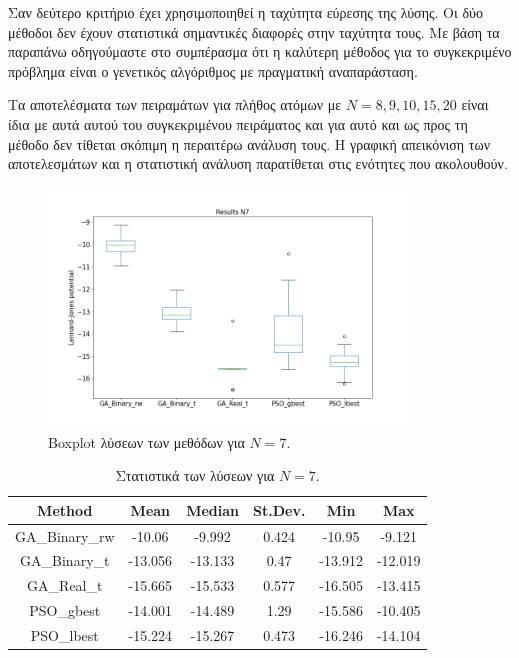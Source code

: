 \documentclass[12pt, a4paper]{article}
\newcommand{\en}{\selectlanguage{english}}
\newcommand{\gr}{\selectlanguage{greek}}
\begin{document}
Σαν δεύτερο κριτήριο έχει χρησιμοποιηθεί η ταχύτητα εύρεσης της λύσης. Οι δύο μέθοδοι δεν έχουν στατιστικά σημαντικές διαφορές στην ταχύτητα τους. Με βάση τα παραπάνω οδηγούμαστε στο συμπέρασμα ότι η καλύτερη μέθοδος για το συγκεκριμένο πρόβλημα είναι ο γενετικός αλγόριθμος με πραγματική αναπαράσταση.

Τα αποτελέσματα των πειραμάτων για πλήθος ατόμων με $Ν = 8, 9, 10, 15, 20$ είναι ίδια με αυτά αυτού του συγκεκριμένου πειράματος και για αυτό και  ως προς τη μέθοδο δεν τίθεται σκόπιμη η περαιτέρω ανάλυση τους. Η γραφική απεικόνιση των αποτελεσμάτων και η στατιστική ανάλυση παρατίθεται στις ενότητες που ακολουθούν.

\begin{figure}[H]
	\centering
	\includegraphics[width=0.85\textwidth, height=0.4\textheight]{../Results/N7/Boxplot_solutions_quality.png}
	
	\caption{\en Boxplot \gr λύσεων των μεθόδων για $N = 7$.}
	\label{box:sol_qual_N7}
\end{figure}


\begin{table}[H]
	\centering
	\begin{tabular}{| c | c | c | c | c | c |}
		
		\hline
		\en Method & \en Mean & \en Median & \en St.Dev. & \en Min & \en Max \\
		
		\hline
		\en GA\_Binary\_rw & -10.06 & -9.992 & 0.424 & -10.95 & -9.121 \\ 
		
		\hline
		\en GA\_Binary\_t & -13.056 & -13.133 & 0.47 & -13.912 & -12.019 \\ 
		
		\hline
		\en GA\_Real\_t & -15.665 & -15.533 & 0.577 & -16.505 & -13.415 \\ 
		
		\hline
		\en PSO\_gbest & -14.001 & -14.489 & 1.29 & -15.586 & -10.405\\ 
		
		\hline
		\en PSO\_lbest & -15.224 & -15.267 & 0.473 & -16.246 & -14.104\\ 
		
		\hline
		
	\end{tabular}
	\caption{Στατιστικά των λύσεων για $N = 7$.}
	\label{tab:sol_qual_N7}
\end{table}
\end{document}
